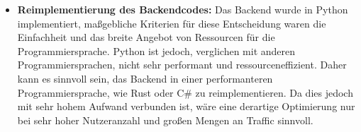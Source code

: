 \begin{itemize}
	\item \textbf{Reimplementierung des Backendcodes:}
	      Das Backend wurde in Python implementiert, maßgebliche Kriterien für diese Entscheidung waren die Einfachheit und das breite Angebot von Ressourcen für die
	      Programmiersprache. Python ist jedoch, verglichen mit anderen Programmiersprachen, nicht sehr performant und ressourceneffizient. Daher kann es sinnvoll sein, das
	      Backend in einer performanteren Programmiersprache, wie Rust oder C\# zu reimplementieren. Da dies jedoch mit sehr hohem Aufwand verbunden ist, wäre eine derartige
	      Optimierung nur bei sehr hoher Nutzeranzahl und großen Mengen an Traffic sinnvoll.

\end{itemize}
